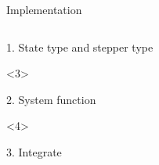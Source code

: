 \documentclass[@BEAMER_OPTIONS@]{beamer}
\begin{document}
\begin{frame}[fragile]{Implementation}
\begin{columns}
\begin{column}[c]{0.62\textwidth}
\begin{onlyenv}
\begin{exampleblock}{1. State type and stepper type}
\begin{adjustbox}{width=0.75\textwidth, height=\textheight, keepaspectratio}
\begin{minipage}{\textwidth}
                        \end{minipage}
                    \end{adjustbox}
                \end{exampleblock}
            \end{onlyenv}
            \begin{onlyenv}<3>
                \begin{exampleblock}{2. System function}
                    \begin{adjustbox}{width=0.73\textwidth, height=\textheight, keepaspectratio}
                        \begin{minipage}{\textwidth}
                            
                        \end{minipage}
                    \end{adjustbox}
                \end{exampleblock}
            \end{onlyenv}
            \begin{onlyenv}<4>
                \begin{exampleblock}{3. Integrate}
                    \begin{adjustbox}{width=0.75\textwidth, height=\textheight, keepaspectratio}
                        \begin{minipage}{\textwidth}
                            
                        \end{minipage}
                    \end{adjustbox}
                \end{exampleblock}
            \end{onlyenv}
        \end{column}
    \end{columns}
\end{frame}
\end{document}
